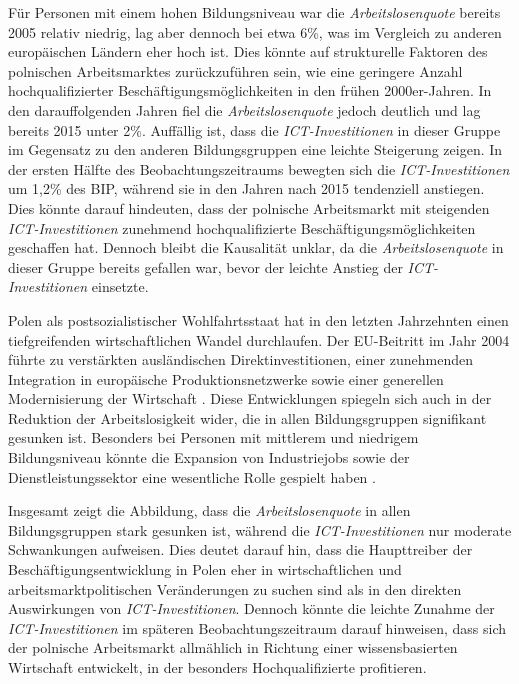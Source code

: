 Für Personen mit einem hohen Bildungsniveau war die \textit{Arbeitslosenquote} bereits 
2005 relativ niedrig, lag aber dennoch bei etwa 6\%, was im Vergleich zu anderen 
europäischen Ländern eher hoch ist. Dies könnte auf strukturelle Faktoren des 
polnischen Arbeitsmarktes zurückzuführen sein, wie eine geringere Anzahl 
hochqualifizierter Beschäftigungsmöglichkeiten in den frühen 2000er-Jahren. In den 
darauffolgenden Jahren fiel die \textit{Arbeitslosenquote} jedoch deutlich und lag 
bereits 2015 unter 2\%. Auffällig ist, dass die \textit{\ac{ICT}-Investitionen} in dieser 
Gruppe im Gegensatz zu den anderen Bildungsgruppen eine leichte Steigerung zeigen. 
In der ersten Hälfte des Beobachtungszeitraums bewegten sich die 
\textit{\ac{ICT}-Investitionen} um 1,2\% des BIP, während sie in den Jahren nach 
2015 tendenziell anstiegen. Dies könnte darauf hindeuten, dass der polnische 
Arbeitsmarkt mit steigenden \textit{\ac{ICT}-Investitionen} zunehmend hochqualifizierte 
Beschäftigungsmöglichkeiten geschaffen hat. Dennoch bleibt die Kausalität unklar, 
da die \textit{Arbeitslosenquote} in dieser Gruppe bereits gefallen war, bevor der 
leichte Anstieg der \textit{\ac{ICT}-Investitionen} einsetzte.

Polen als postsozialistischer Wohlfahrtsstaat hat in den letzten Jahrzehnten einen 
tiefgreifenden wirtschaftlichen Wandel durchlaufen. Der EU-Beitritt im Jahr 2004 
führte zu verstärkten ausländischen Direktinvestitionen, einer zunehmenden 
Integration in europäische Produktionsnetzwerke sowie einer generellen 
Modernisierung der Wirtschaft \parencite[vgl.][S. 455–457]{myant2013transition}. Diese 
Entwicklungen spiegeln sich auch in der Reduktion der Arbeitslosigkeit wider, die in 
allen Bildungsgruppen signifikant gesunken ist. Besonders bei Personen mit mittlerem 
und niedrigem Bildungsniveau könnte die Expansion von Industriejobs sowie der 
Dienstleistungssektor eine wesentliche Rolle gespielt haben 
\parencite[vgl.][S. 455–459]{myant2013transition}.

Insgesamt zeigt die Abbildung, dass die \textit{Arbeitslosenquote} in allen 
Bildungsgruppen stark gesunken ist, während die \textit{\ac{ICT}-Investitionen} nur 
moderate Schwankungen aufweisen. Dies deutet darauf hin, dass die Haupttreiber der 
Beschäftigungsentwicklung in Polen eher in wirtschaftlichen und 
arbeitsmarktpolitischen Veränderungen zu suchen sind als in den direkten 
Auswirkungen von \textit{\ac{ICT}-Investitionen}. Dennoch könnte die leichte 
Zunahme der \textit{\ac{ICT}-Investitionen} im späteren Beobachtungszeitraum 
darauf hinweisen, dass sich der polnische Arbeitsmarkt allmählich in Richtung 
einer wissensbasierten Wirtschaft entwickelt, in der besonders Hochqualifizierte 
profitieren.

